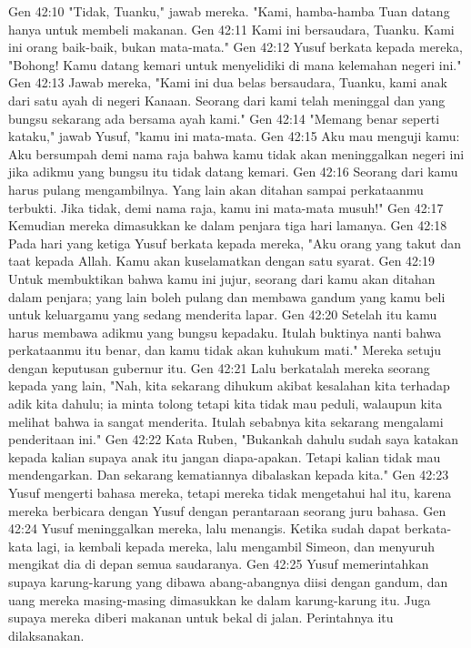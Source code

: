 Gen 42:10  "Tidak, Tuanku," jawab mereka. "Kami, hamba-hamba Tuan datang hanya untuk membeli makanan.
Gen 42:11  Kami ini bersaudara, Tuanku. Kami ini orang baik-baik, bukan mata-mata."
Gen 42:12  Yusuf berkata kepada mereka, "Bohong! Kamu datang kemari untuk menyelidiki di mana kelemahan negeri ini."
Gen 42:13  Jawab mereka, "Kami ini dua belas bersaudara, Tuanku, kami anak dari satu ayah di negeri Kanaan. Seorang dari kami telah meninggal dan yang bungsu sekarang ada bersama ayah kami."
Gen 42:14  "Memang benar seperti kataku," jawab Yusuf, "kamu ini mata-mata.
Gen 42:15  Aku mau menguji kamu: Aku bersumpah demi nama raja bahwa kamu tidak akan meninggalkan negeri ini jika adikmu yang bungsu itu tidak datang kemari.
Gen 42:16  Seorang dari kamu harus pulang mengambilnya. Yang lain akan ditahan sampai perkataanmu terbukti. Jika tidak, demi nama raja, kamu ini mata-mata musuh!"
Gen 42:17  Kemudian mereka dimasukkan ke dalam penjara tiga hari lamanya.
Gen 42:18  Pada hari yang ketiga Yusuf berkata kepada mereka, "Aku orang yang takut dan taat kepada Allah. Kamu akan kuselamatkan dengan satu syarat.
Gen 42:19  Untuk membuktikan bahwa kamu ini jujur, seorang dari kamu akan ditahan dalam penjara; yang lain boleh pulang dan membawa gandum yang kamu beli untuk keluargamu yang sedang menderita lapar.
Gen 42:20  Setelah itu kamu harus membawa adikmu yang bungsu kepadaku. Itulah buktinya nanti bahwa perkataanmu itu benar, dan kamu tidak akan kuhukum mati." Mereka setuju dengan keputusan gubernur itu.
Gen 42:21  Lalu berkatalah mereka seorang kepada yang lain, "Nah, kita sekarang dihukum akibat kesalahan kita terhadap adik kita dahulu; ia minta tolong tetapi kita tidak mau peduli, walaupun kita melihat bahwa ia sangat menderita. Itulah sebabnya kita sekarang mengalami penderitaan ini."
Gen 42:22  Kata Ruben, "Bukankah dahulu sudah saya katakan kepada kalian supaya anak itu jangan diapa-apakan. Tetapi kalian tidak mau mendengarkan. Dan sekarang kematiannya dibalaskan kepada kita."
Gen 42:23  Yusuf mengerti bahasa mereka, tetapi mereka tidak mengetahui hal itu, karena mereka berbicara dengan Yusuf dengan perantaraan seorang juru bahasa.
Gen 42:24  Yusuf meninggalkan mereka, lalu menangis. Ketika sudah dapat berkata-kata lagi, ia kembali kepada mereka, lalu mengambil Simeon, dan menyuruh mengikat dia di depan semua saudaranya.
Gen 42:25  Yusuf memerintahkan supaya karung-karung yang dibawa abang-abangnya diisi dengan gandum, dan uang mereka masing-masing dimasukkan ke dalam karung-karung itu. Juga supaya mereka diberi makanan untuk bekal di jalan. Perintahnya itu dilaksanakan.
